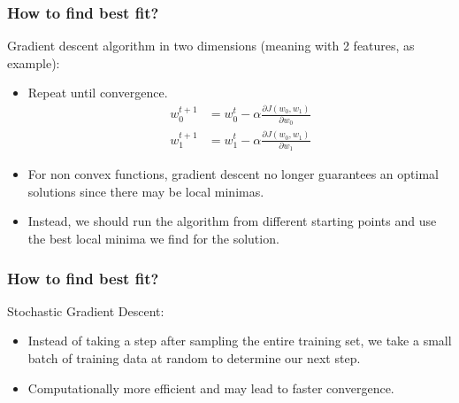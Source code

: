 \begin{frame}[fragile]\frametitle{How to find best fit?}
Gradient descent algorithm in two dimensions (meaning with 2 features, as example):
\begin{itemize}
\item  Repeat until convergence.
\begin{align*}
w_0^{t+1} &= w_0^t - \alpha \frac{\partial J(w_0,w_1)}{\partial w_{0}}\\
w_1^{t+1} &= w_1^t - \alpha \frac{\partial J(w_0,w_1)}{\partial w_{1}}
\end{align*}
\item For non convex functions, gradient descent no longer guarantees an optimal solutions since there may be local minimas. 
\item Instead, we should run the algorithm from different
starting points and use the best local minima we find for
the solution.
\end{itemize}

\end{frame}

\begin{frame}[fragile]\frametitle{How to find best fit?}
Stochastic Gradient Descent:

\begin{itemize}
\item  Instead of taking a step
after sampling the entire training set, we take a small
batch of training data at random to determine our next
step. 
\item Computationally more efficient and may lead to
faster convergence.
\end{itemize}

\end{frame}





